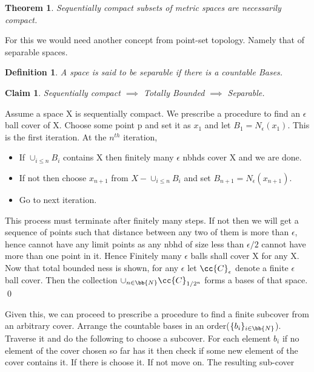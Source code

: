 \documentclass{myclass}
\newtheorem*{definition}{Definition}
\newtheorem*{claim}{Claim}
\newtheorem*{theorem}{Theorem}
\begin{document}
\begin{theorem}
    Sequentially compact subsets of metric spaces are necessarily compact.
\end{theorem}
\begin{prf}
    For this we would need another concept from point-set topology. Namely that of separable spaces.
    \begin{definition}
        A space is said to be separable if there is a countable Bases.
    \end{definition}
    \begin{claim}
        Sequentially compact $\implies$ Totally Bounded $\implies$ Separable.
    \end{claim}
    \begin{subprf}
         Assume a space X is sequentially compact. We prescribe a procedure to find an $\epsilon$ ball cover of X. Choose some point p and set it as $x_1$ and let $B_1=N_{\epsilon}(x_1)$.
         This is the first iteration. At the $n^{th}$ iteration,
         \begin{itemize}
            \item If $\cup_{i\leq n}B_i$ contains X then finitely many $\epsilon$ nbhds cover X and we are done. 
            \item If not then choose $x_{n+1}$ from $X-\cup_{i\leq n}B_i$ and set $B_{n+1}=N_\epsilon(x_{n+1})$.
            \item Go to next iteration. 
         \end{itemize}
         This process must terminate after finitely many steps. If not then we will get a sequence of points such that distance between any two of them is more than $\epsilon$, hence cannot have any limit points as any nbhd of size less than $\epsilon/2$ cannot have more than one point in it.
         Hence Finitely many $\epsilon$ balls shall cover X for any X. Now that total bounded ness is shown, for any $\epsilon$ let $\cc{C}_\epsilon$ denote a finite $\epsilon$ ball cover. Then the collection $\cup_{n\in\bb{N}}\cc{C}_{1/2^n}$ forms a bases of that space.
         \qed
    \end{subprf}
    Given this, we can proceed to prescribe a procedure to find a finite subcover from an arbitrary cover. Arrange the countable bases in an order($\{b_i\}_{i\in\bb{N}}$). Traverse it and do the following to choose a subcover. For each element $b_i$ if no element of the cover chosen so far has it then check if some new element of the cover contains it. If there is choose it. If not move on. The resulting sub-cover

\end{prf}
\end{document}
